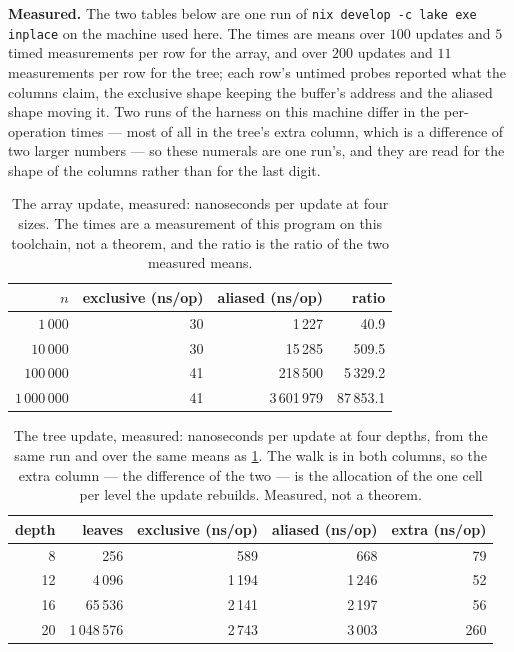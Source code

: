 \documentclass[11pt,a4paper]{article}
\theoremstyle{definition}
\newcommand{\code}[1]{\texttt{#1}}
\begin{document}
\textbf{Measured.} The two tables below are one run of \code{nix develop -c lake
exe inplace} on the machine used here. The times are means over $100$ updates and
$5$ timed measurements per row for the array, and over $200$ updates and $11$
measurements per row for the tree; each row's untimed probes reported what the
columns claim, the exclusive shape keeping the buffer's address and the aliased
shape moving it. Two runs of the harness on this machine differ in the
per-operation times --- most of all in the tree's extra column, which is a
difference of two larger numbers --- so these numerals are one run's, and they are
read for the shape of the columns rather than for the last digit.

\begin{table}[ht]
\centering
\small
\caption{The array update, measured: nanoseconds per update at four sizes. The
times are a measurement of this program on this toolchain, not a theorem, and the
ratio is the ratio of the two measured means.}
\label{tab:bench-array}
\begin{tabular}{rrrr}
\toprule
$n$ & exclusive (ns/op) & aliased (ns/op) & ratio \\
\midrule
$1\,000$ & 30 & 1\,227 & 40.9 \\
$10\,000$ & 30 & 15\,285 & 509.5 \\
$100\,000$ & 41 & 218\,500 & 5\,329.2 \\
$1\,000\,000$ & 41 & 3\,601\,979 & 87\,853.1 \\
\bottomrule
\end{tabular}
\end{table}

\begin{table}[ht]
\centering
\small
\caption{The tree update, measured: nanoseconds per update at four depths, from
the same run and over the same means as \cref{tab:bench-array}. The walk is in
both columns, so the extra column --- the difference of the two --- is the
allocation of the one cell per level the update rebuilds. Measured, not a
theorem.}
\label{tab:bench-tree}
\begin{tabular}{rrrrr}
\toprule
depth & leaves & exclusive (ns/op) & aliased (ns/op) & extra (ns/op) \\
\midrule
8 & 256 & 589 & 668 & 79 \\
12 & 4\,096 & 1\,194 & 1\,246 & 52 \\
16 & 65\,536 & 2\,141 & 2\,197 & 56 \\
20 & 1\,048\,576 & 2\,743 & 3\,003 & 260 \\
\bottomrule
\end{tabular}
\end{table}
\end{document}
